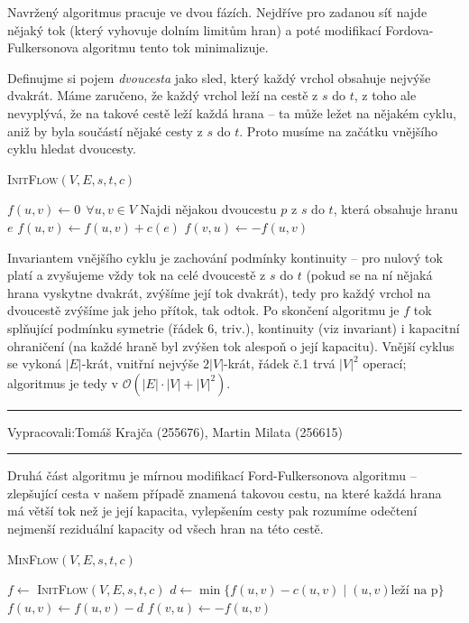 \documentclass[12pt]{article}
\newcommand{\la}{\leftarrow}
\renewcommand{\O}{\mathcal{O}}
\newcommand{\zadani}[2]{
{\large
\noindent {\bf IB108 \hfill{} Sada #1, Příklad #2 \\[-4mm]}
\noindent\hrule
\vspace{2mm}
\noindent Vypracovali:\hfill{}Tomáš Krajča (255676), Martin Milata (256615)
\vspace{3mm}
\hrule
\bigskip\bigskip}
}
\begin{document}
Navržený algoritmus pracuje ve dvou fázích. Nejdříve pro zadanou síť najde nějaký tok (který
vyhovuje dolním limitům hran) a poté modifikací Fordova-Fulkersonova algoritmu tento tok
minimalizuje.

Definujme si pojem \emph{dvoucesta} jako sled, který každý vrchol obsahuje nejvýše dvakrát. Máme
zaručeno, že každý vrchol leží na cestě z $s$ do $t$, z toho ale nevyplývá, že na takové cestě leží
každá hrana -- ta může ležet na nějakém cyklu, aniž by byla součástí nějaké cesty z $s$ do $t$.
Proto musíme na začátku vnějšího cyklu hledat dvoucesty.

\begin{algorithm}
\textsc{InitFlow}$(V,E,s,t,c)$
\begin{algorithmic}[1]
\STATE $f(u,v) \la 0 \ \ \forall u,v \in V$
\STATE Najdi nějakou dvoucestu $p$ z $s$ do $t$, která obsahuje hranu $e$
\STATE $f(u,v) \la f(u,v) + c(e)$
\STATE $f(v,u) \la -f(u,v)$
\ENDFOR
\ENDFOR
\end{algorithmic}
\end{algorithm}

\noindent
Invariantem vnějšího cyklu je zachování podmínky kontinuity -- pro nulový tok platí a zvyšujeme vždy
tok na celé dvoucestě z $s$ do $t$ (pokud se na ní nějaká hrana vyskytne dvakrát, zvýšíme její tok
dvakrát), tedy pro každý vrchol na dvoucestě zvýšíme jak jeho přítok, tak odtok. Po skončení
algoritmu je $f$ tok splňující podmínku symetrie (řádek 6, triv.), kontinuity (viz invariant) i
kapacitní ohraničení (na každé hraně byl zvýšen tok alespoň o její kapacitu). Vnější cyklus se vykoná
$|E|$-krát, vnitřní nejvýše $2|V|$-krát, řádek č.1 trvá $|V|^2$ operací; algoritmus je tedy v
$\O(|E|\cdot|V| + |V|^2)$.


\clearpage
\zadani{3}{3}

\noindent
Druhá část algoritmu je mírnou modifikací Ford-Fulkersonova algoritmu -- zlepšující cesta v
našem případě znamená takovou cestu, na které každá hrana má větší tok než je její kapacita,
vylepšením cesty pak rozumíme odečtení nejmenší reziduální kapacity od všech hran na této cestě.

\begin{algorithm}
\textsc{MinFlow}$(V,E,s,t,c)$
\begin{algorithmic}
\STATE $f \la $ \textsc{InitFlow}$(V,E,s,t,c)$
\STATE $d \la \min\{f(u,v) - c(u,v) \mid (u,v) \text{leží na p}\}$
\STATE $f(u,v) \la f(u,v) - d$
\STATE $f(v,u) \la -f(u,v)$
\ENDFOR
\ENDWHILE
\end{algorithmic}
\end{algorithm}
\end{document}
